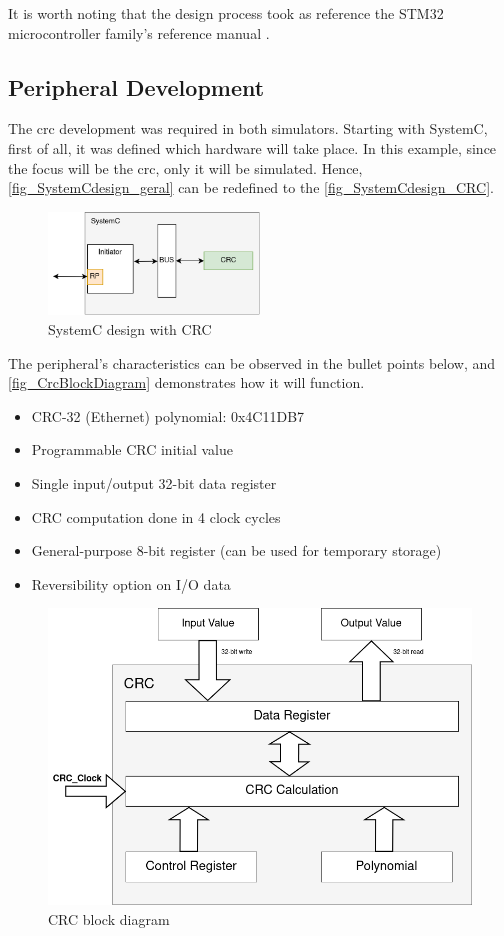 It is worth noting that the design process took as reference the STM32 microcontroller family's reference manual \cite{referenceManualRM0385}.

\subsection{Peripheral Development}

The \gls{crc} development was required in both simulators. Starting with SystemC, first of all, it was defined which hardware will take place.
In this example, since the focus will be the \gls{crc}, only it will be simulated. Hence, \autoref{fig_SystemCdesign_geral} can be redefined to 
the \autoref{fig_SystemCdesign_CRC}.

\begin{figure}[H]
	\centering
	\includegraphics[width=0.5\textwidth]{Images/SystemCdesign_CRC.png}
	\caption{SystemC design with CRC}
	\label{fig_SystemCdesign_CRC}
\end{figure}

The peripheral's characteristics can be observed in the bullet points below, and \autoref{fig_CrcBlockDiagram} demonstrates how it will function.

\begin{itemize}
	\item CRC-32 (Ethernet) polynomial: 0x4C11DB7
	\item Programmable CRC initial value
	\item Single input/output 32-bit data register
	\item CRC computation done in 4 clock cycles 
	\item General-purpose 8-bit register (can be used for temporary storage)
	\item Reversibility option on I/O data
\end{itemize}

\begin{figure}[]
	\centering
 	\includegraphics[width=0.65\linewidth]{Images/CrcBlockDiagram.png}
 	\caption{CRC block diagram}
	 \label{fig_CrcBlockDiagram}
\end{figure}


